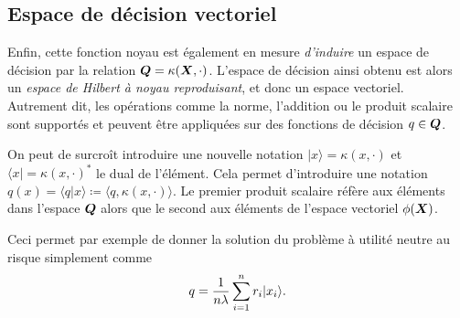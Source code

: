 \subsection{Espace de décision vectoriel}


Enfin, cette fonction noyau est également en mesure \textit{d'induire} un espace de
décision par la relation $\bm Q = \kappa(\bm{X},\cdot)$. L'espace de décision ainsi obtenu est alors un
\textit{espace de Hilbert à noyau reproduisant}, et donc un espace vectoriel. Autrement
dit, les opérations comme la norme, l'addition ou le produit scalaire sont supportés et
peuvent être appliquées sur des fonctions de décision $q \in \bm Q$. 

On peut de surcroît introduire une nouvelle notation $|x\rangle = \kappa(x,\cdot)$ et
$\langle x| = \kappa(x,\cdot)^*$ le dual de l'élément. Cela permet d'introduire une notation
$q(x) = \langle q|x \rangle \coloneq \langle q,\kappa(x,\cdot)\rangle$. Le premier produit scalaire réfère aux éléments dans
l'espace $\bm Q$ alors que le second aux éléments de l'espace vectoriel $\phi(\bm{X})$.

Ceci permet par exemple de donner la solution du problème à utilité neutre au risque
simplement comme
\begin{equation}
  q = \frac{1}{n\lambda}\sum_{i=1}^n r_i|x_i\rangle.
\end{equation}








